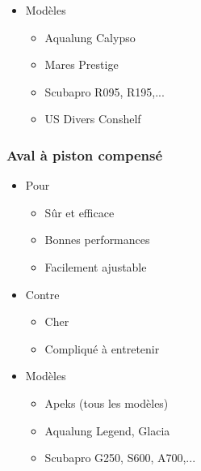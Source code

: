 \documentclass[aspectratio=1610,english,12pt]{beamer}
\begin{document}
\begin{frame}{\insertsubsubsection}
	\begin{itemize}
		\item Modèles
		\begin{itemize}
			\item Aqualung Calypso
			\item Mares Prestige
			\item Scubapro R095, R195,...
			\item US Divers Conshelf
		\end{itemize}
	\end{itemize}
\end{frame}


\subsubsection{Aval à piston compensé}
\begin{frame}{\insertsubsubsection}
\end{frame}

\begin{frame}{\insertsubsubsection}
\end{frame}

\begin{frame}{\insertsubsubsection}
	\begin{itemize}
		\item Pour
		\begin{itemize}
			\item Sûr et efficace
			\item Bonnes performances
			\item Facilement ajustable
		\end{itemize}
		\item Contre
		\begin{itemize}
			\item Cher
			\item Compliqué à entretenir
		\end{itemize}
	\end{itemize}
\end{frame}

\begin{frame}{\insertsubsubsection}
	\begin{itemize}
		\item Modèles
		\begin{itemize}
			\item Apeks (tous les modèles)
			\item Aqualung Legend, Glacia
			\item Scubapro G250, S600, A700,...
		\end{itemize}
	\end{itemize}
\end{frame}
\end{document}
